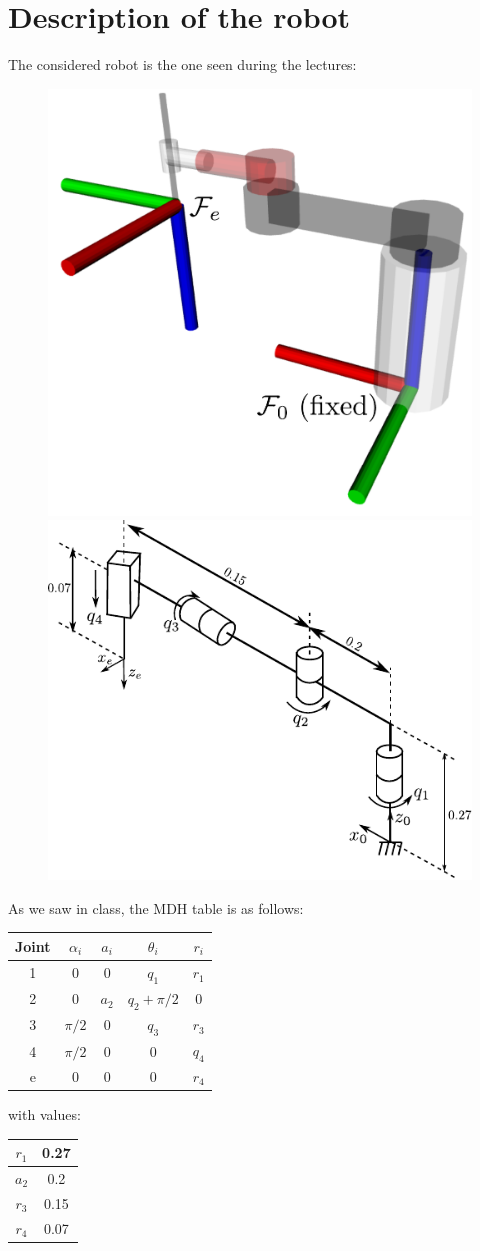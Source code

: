 \documentclass{ecnreport}
\begin{document}

\section{Description of the robot}

The considered robot is the one seen during the lectures:
\begin{figure}[h!]\centering
\includegraphics[height=.4\linewidth]{rrrp_rviz} \quad
\includegraphics[height=.4\linewidth]{rrrp}   
\end{figure}

As we saw in class, the MDH table is as follows:
\begin{center}
\begin{tabular}{|c|c|c|c|c|}\hline
        Joint & $\alpha_i$ & $a_i$ &  $\theta_i$ & $r_i$\\\hline 
        1 & 0 & 0 & $q_1$ & $r_1$ \\\hline
        2 & 0& $a_2$  & $q_2+\pi/2$ & 0\\\hline
        3 & $\pi/2$ & 0 & $q_3$ & $r_3$\\\hline
        4 & $\pi/2$ & 0 & 0 & $q_4$\\\hline
        e & 0 & 0 & 0 & $r_4$\\\hline
    \end{tabular}
    with values: \begin{tabular}{|c|c|}\hline		
        $r_1$ & 0.27\\\hline
        $a_2$ & 0.2\\\hline
        $r_3$ & 0.15\\\hline
        $r_4$ & 0.07\\\hline
    \end{tabular}
\end{center}
\end{document}
